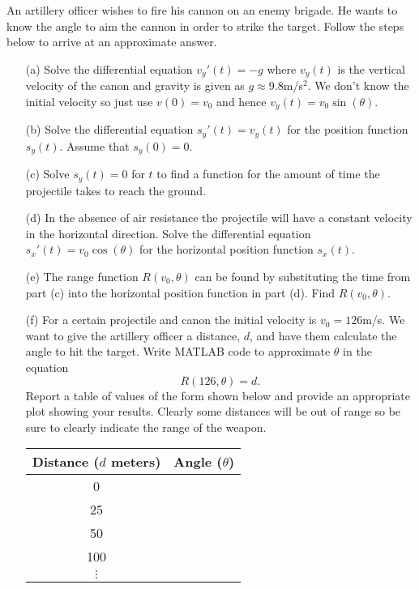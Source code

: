 \begin{problem}
    An artillery officer wishes to fire his cannon on an enemy brigade.  He wants to know
    the angle to aim the cannon in order to strike the target.  Follow the steps below to
    arrive at an approximate answer.
    \begin{enumerate}
        \item[(a)] Solve the differential equation $v_y'(t) = -g$ where $v_y(t)$ is the
            vertical
            velocity of the canon and gravity is given as $g \approx 9.8$m/s$^2$.  We
            don't know the initial velocity so just use $v(0) = v_0$ and hence $v_y(t) =
            v_0 \sin(\theta)$.
        \item[(b)] Solve the differential equation $s_y'(t) = v_y(t)$ for the position
            function $s_y(t)$.  Assume that $s_y(0) = 0$.
        \item[(c)] Solve $s_y(t) = 0$ for $t$ to find a function for the amount of time
            the projectile takes to reach the ground.
        \item[(d)] In the absence of air resistance the projectile will have a constant
            velocity in the horizontal direction.  Solve the differential equation
            $s_x'(t) = v_0 \cos(\theta)$ for the horizontal position function $s_x(t)$.  
        \item[(e)] The range function $R(v_0,\theta)$ can be found by substituting the
            time from part (c) into the horizontal position function in part (d).  Find
            $R(v_0,\theta)$.
        \item[(f)] For a certain projectile and canon the initial velocity is $v_0 =
            126$m/s.  We want to give the artillery officer a distance, $d$, and have them
            calculate the angle to hit the target.  Write MATLAB code to approximate
            $\theta$ in the equation 
            \[ R(126,\theta) = d. \]
            Report a table of values of the form shown below and provide an appropriate
            plot showing your results.  Clearly some distances will be out of range so be
            sure to clearly indicate the range of the weapon.
            \begin{center}
                \begin{tabular}{|c|c|}
                    \hline
                    Distance ($d$ meters) & Angle ($\theta$) \\ \hline \hline
                    0 & \\
                    25 & \\
                    50 & \\
                    100 & \\
                    $\vdots$ & \\ \hline
                \end{tabular}
            \end{center}
    \end{enumerate}
\end{problem}




